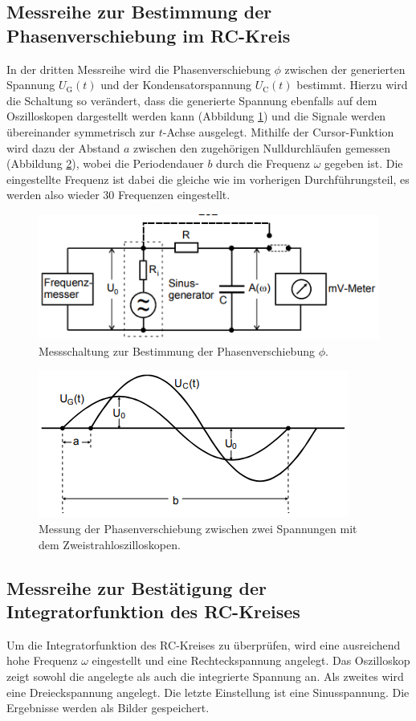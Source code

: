 \subsection{Messreihe zur Bestimmung der Phasenverschiebung im RC-Kreis}
In der dritten Messreihe wird die Phasenverschiebung $\phi$ zwischen der generierten 
Spannung $U_\text{G}(t)$ und der Kondensatorspannung $U_\text{C}(t)$ bestimmt.
Hierzu wird die Schaltung so verändert, dass die generierte Spannung ebenfalls auf 
dem Oszilloskopen dargestellt werden kann (Abbildung \ref{fig:v353_3}) und die Signale 
werden übereinander 
symmetrisch zur $t$-Achse ausgelegt. Mithilfe der Cursor-Funktion wird dazu der Abstand
$a$ zwischen den zugehörigen Nulldurchläufen gemessen (Abbildung \ref{fig:phi}), wobei
die Periodendauer $b$ durch die Frequenz $\omega$ gegeben ist. Die eingestellte Frequenz
ist dabei die gleiche wie im vorherigen Durchführungsteil, es werden also wieder 30 Frequenzen eingestellt.
\begin{figure}[H]
  \centering
  \includegraphics{V353_2.png}
  \caption{Messschaltung zur Bestimmung der Phasenverschiebung $\phi$. \cite[S. 7]{kent}}
  \label{fig:v353_3}
\end{figure}
\begin{figure}
  \centering
  \includegraphics{phi.png}
  \caption{Messung der Phasenverschiebung zwischen zwei Spannungen mit dem
Zweistrahloszilloskopen. \cite[S. 7]{kent}}
  \label{fig:phi}
\end{figure}

\subsection{Messreihe zur Bestätigung der Integratorfunktion des RC-Kreises}
Um die Integratorfunktion des RC-Kreises zu überprüfen, wird eine ausreichend hohe
Frequenz $\omega$ eingestellt und eine Rechteckspannung angelegt. Das Oszilloskop 
zeigt sowohl die angelegte als auch die integrierte Spannung an. Als zweites wird eine
Dreieckspannung angelegt. Die letzte Einstellung ist eine Sinusspannung. Die Ergebnisse
werden als Bilder gespeichert.